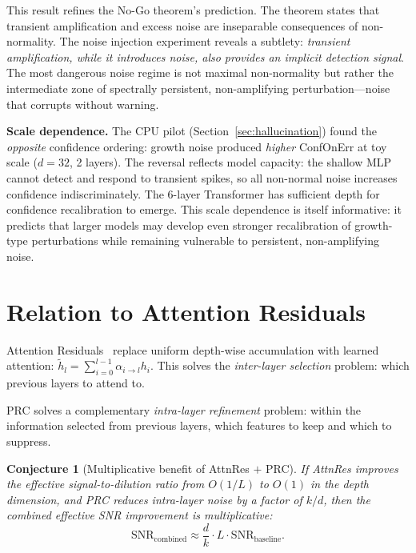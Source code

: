 \documentclass[11pt,a4paper]{article}
\newtheorem{conjecture}[theorem]{Conjecture}
\theoremstyle{definition}
\begin{document}
This result refines the No-Go theorem's prediction. The theorem
states that transient amplification and excess noise are inseparable
consequences of non-normality. The noise injection experiment reveals
a subtlety: \emph{transient amplification, while it introduces noise,
also provides an implicit detection signal}. The most dangerous noise
regime is not maximal non-normality but rather the intermediate zone
of spectrally persistent, non-amplifying perturbation---noise that
corrupts without warning.

\textbf{Scale dependence.}
The CPU pilot (Section~\ref{sec:hallucination}) found the
\emph{opposite} confidence ordering: growth noise produced
\emph{higher} ConfOnErr at toy scale ($d = 32$, 2 layers).
The reversal reflects model capacity: the shallow MLP cannot
detect and respond to transient spikes, so all non-normal noise
increases confidence indiscriminately. The 6-layer Transformer
has sufficient depth for confidence recalibration to emerge.
This scale dependence is itself informative: it predicts that
larger models may develop even stronger recalibration of
growth-type perturbations while remaining vulnerable to
persistent, non-amplifying noise.

\section{Relation to Attention Residuals}
\label{sec:attnres}

Attention Residuals~\cite{chen2026attnres} replace uniform depth-wise
accumulation with learned attention:
$\tilde{h}_l = \sum_{i=0}^{l-1} \alpha_{i \to l} h_i$.
This solves the \emph{inter-layer selection} problem: which previous layers
to attend to.

PRC solves a complementary \emph{intra-layer refinement} problem: within
the information selected from previous layers, which features to keep and
which to suppress.

\begin{conjecture}[Multiplicative benefit of AttnRes $+$ PRC]
\label{conj:combination}
If AttnRes improves the effective signal-to-dilution ratio from $O(1/L)$
to $O(1)$ in the depth dimension, and PRC reduces intra-layer noise by a
factor of $k/d$, then the combined effective SNR improvement is multiplicative:
\[
  \mathrm{SNR}_{\mathrm{combined}} \approx
  \frac{d}{k} \cdot L \cdot \mathrm{SNR}_{\mathrm{baseline}}.
\]
\end{conjecture}
\end{document}
